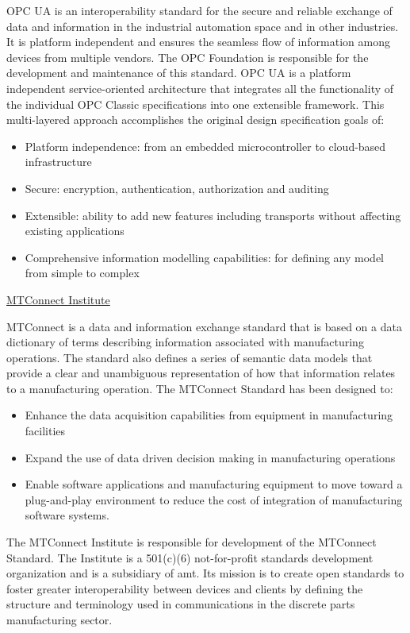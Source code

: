 OPC UA is an interoperability standard for the secure and reliable exchange of data and information in the industrial automation space and in other industries.  It is platform independent and ensures the seamless flow of information among devices from multiple vendors. The OPC Foundation is responsible for the development and maintenance of this standard.
OPC UA is a platform independent service-oriented architecture that integrates all the functionality of the individual OPC Classic specifications into one extensible framework. This multi-layered approach accomplishes the original design specification goals of:
\begin{itemize}
    \item Platform independence: from an embedded microcontroller to cloud-based infrastructure
    \item Secure: encryption, authentication, authorization and auditing
    \item Extensible: ability to add new features including transports without affecting existing applications
    \item Comprehensive information modelling capabilities: for defining any model from simple to complex 
\end{itemize} 

\quad\underline{MTConnect Institute}

MTConnect is a data and information exchange standard that is based on a data dictionary of terms describing information associated with manufacturing operations.  The standard also defines a series of semantic data models that provide a clear and unambiguous representation of how that information relates to a manufacturing operation.  The MTConnect Standard has been designed to:
\begin{itemize}
    \item Enhance the data acquisition capabilities from equipment in manufacturing facilities
    \item Expand the use of data driven decision making in manufacturing operations
    \item Enable software applications and manufacturing equipment to move toward a plug-and-play environment to reduce the cost of integration of manufacturing software systems.  
\end{itemize}

The MTConnect Institute is responsible for development of the MTConnect Standard.  The Institute is a 501(c)(6) not-for-profit standards development organization and is a subsidiary of \gls{amt}. Its mission is to create open standards to foster greater interoperability between devices and clients by defining the structure and terminology used in communications in the discrete parts manufacturing sector.

